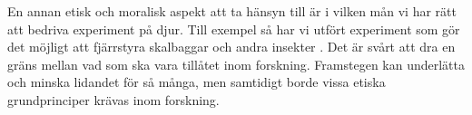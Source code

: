 \documentclass[12pt, a4paper]{article}
\begin{document}
En annan etisk och moralisk aspekt att ta hänsyn till är i vilken mån vi har rätt att bedriva experiment på djur. Till exempel så har vi utfört experiment som gör det möjligt att fjärrstyra skalbaggar och andra insekter \cite{ethics2}. Det är svårt att dra en gräns mellan vad som ska vara tillåtet inom forskning. Framstegen kan underlätta och minska lidandet för så många, men samtidigt borde vissa etiska grundprinciper krävas inom forskning.







%
%




\pagebreak


\end{document}

